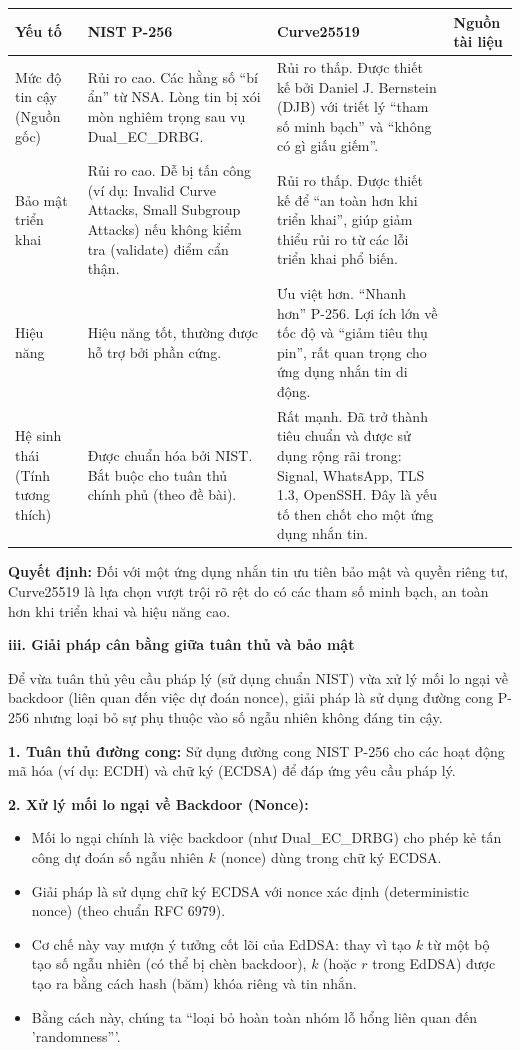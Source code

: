 \begin{center}
\begin{tabular}{|p{3.5cm}|p{4.5cm}|p{4.5cm}|p{3cm}|}
\hline
\textbf{Yếu tố} & \textbf{NIST P-256} & \textbf{Curve25519} & \textbf{Nguồn tài liệu} \\
\hline
Mức độ tin cậy (Nguồn gốc) & Rủi ro cao. Các hằng số ``bí ẩn'' từ NSA. Lòng tin bị xói mòn nghiêm trọng sau vụ Dual\_EC\_DRBG. & Rủi ro thấp. Được thiết kế bởi Daniel J. Bernstein (DJB) với triết lý ``tham số minh bạch'' và ``không có gì giấu giếm''. & \\
\hline
Bảo mật triển khai & Rủi ro cao. Dễ bị tấn công (ví dụ: Invalid Curve Attacks, Small Subgroup Attacks) nếu không kiểm tra (validate) điểm cẩn thận. & Rủi ro thấp. Được thiết kế để ``an toàn hơn khi triển khai'', giúp giảm thiểu rủi ro từ các lỗi triển khai phổ biến. & \\
\hline
Hiệu năng & Hiệu năng tốt, thường được hỗ trợ bởi phần cứng. & Ưu việt hơn. ``Nhanh hơn'' P-256. Lợi ích lớn về tốc độ và ``giảm tiêu thụ pin'', rất quan trọng cho ứng dụng nhắn tin di động. & \\
\hline
Hệ sinh thái (Tính tương thích) & Được chuẩn hóa bởi NIST. Bắt buộc cho tuân thủ chính phủ (theo đề bài). & Rất mạnh. Đã trở thành tiêu chuẩn và được sử dụng rộng rãi trong: Signal, WhatsApp, TLS 1.3, OpenSSH. Đây là yếu tố then chốt cho một ứng dụng nhắn tin. & \\
\hline
\end{tabular}
\end{center}

\textbf{Quyết định:} Đối với một ứng dụng nhắn tin ưu tiên bảo mật và quyền riêng tư, Curve25519 là lựa chọn vượt trội rõ rệt do có các tham số minh bạch, an toàn hơn khi triển khai và hiệu năng cao.

\textbf{iii. Giải pháp cân bằng giữa tuân thủ và bảo mật}

Để vừa tuân thủ yêu cầu pháp lý (sử dụng chuẩn NIST) vừa xử lý mối lo ngại về backdoor (liên quan đến việc dự đoán nonce), giải pháp là sử dụng đường cong P-256 nhưng loại bỏ sự phụ thuộc vào số ngẫu nhiên không đáng tin cậy.

\textbf{1. Tuân thủ đường cong:} Sử dụng đường cong NIST P-256 cho các hoạt động mã hóa (ví dụ: ECDH) và chữ ký (ECDSA) để đáp ứng yêu cầu pháp lý.

\textbf{2. Xử lý mối lo ngại về Backdoor (Nonce):}

\begin{itemize}
    \item Mối lo ngại chính là việc backdoor (như Dual\_EC\_DRBG) cho phép kẻ tấn công dự đoán số ngẫu nhiên $k$ (nonce) dùng trong chữ ký ECDSA.
    \item Giải pháp là sử dụng chữ ký ECDSA với nonce xác định (deterministic nonce) (theo chuẩn RFC 6979).
    \item Cơ chế này vay mượn ý tưởng cốt lõi của EdDSA: thay vì tạo $k$ từ một bộ tạo số ngẫu nhiên (có thể bị chèn backdoor), $k$ (hoặc $r$ trong EdDSA) được tạo ra bằng cách hash (băm) khóa riêng và tin nhắn.
    \item Bằng cách này, chúng ta ``loại bỏ hoàn toàn nhóm lỗ hổng liên quan đến 'randomness'''.
\end{itemize}

